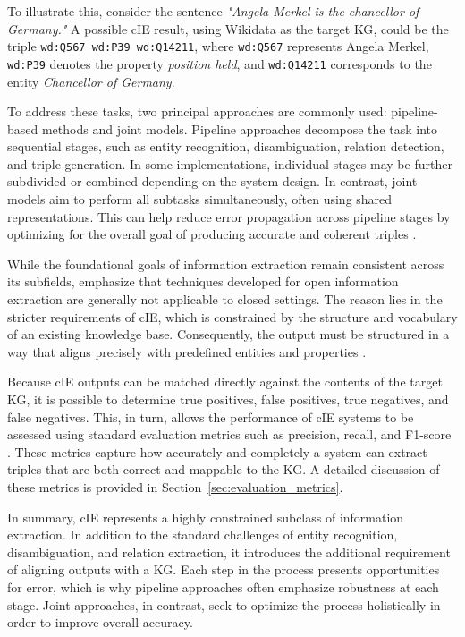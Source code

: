 \documentclass[a4paper,oneside,bibliography=totoc]{scrbook}
\begin{document}
To illustrate this, consider the sentence \textit{"Angela Merkel is the chancellor of Germany."} A possible \ac{cIE} result, using Wikidata as the target \ac{KG}, could be the triple \texttt{wd:Q567\ wd:P39\ wd:Q14211}, where \texttt{wd:Q567} represents Angela Merkel, \texttt{wd:P39} denotes the property \textit{position held}, and \texttt{wd:Q14211} corresponds to the entity \textit{Chancellor of Germany}.

To address these tasks, two principal approaches are commonly used: pipeline-based methods and joint models. Pipeline approaches decompose the task into sequential stages, such as entity recognition, disambiguation, relation detection, and triple generation. In some implementations, individual stages may be further subdivided or combined depending on the system design. In contrast, joint models aim to perform all subtasks simultaneously, often using shared representations. This can help reduce error propagation across pipeline stages by optimizing for the overall goal of producing accurate and coherent triples \cite{Zhao2024,Josifoski2021}.

While the foundational goals of information extraction remain consistent across its subfields, \citet{Josifoski2021} emphasize that techniques developed for open information extraction are generally not applicable to closed settings. The reason lies in the stricter requirements of \ac{cIE}, which is constrained by the structure and vocabulary of an existing knowledge base. Consequently, the output must be structured in a way that aligns precisely with predefined entities and properties \cite{Josifoski2021}.

Because \ac{cIE} outputs can be matched directly against the contents of the target \ac{KG}, it is possible to determine true positives, false positives, true negatives, and false negatives. This, in turn, allows the performance of \ac{cIE} systems to be assessed using standard evaluation metrics such as precision, recall, and F1-score \cite{Josifoski2021,Josifoski2023}. These metrics capture how accurately and completely a system can extract triples that are both correct and mappable to the \ac{KG}. A detailed discussion of these metrics is provided in Section~\ref{sec:evaluation_metrics}.

In summary, \ac{cIE} represents a highly constrained subclass of information extraction. In addition to the standard challenges of entity recognition, disambiguation, and relation extraction, it introduces the additional requirement of aligning outputs with a \ac{KG}. Each step in the process presents opportunities for error, which is why pipeline approaches often emphasize robustness at each stage. Joint approaches, in contrast, seek to optimize the process holistically in order to improve overall accuracy.
\end{document}
